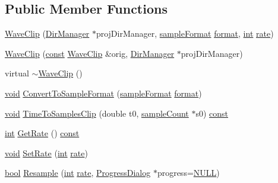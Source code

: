 \subsection*{Public Member Functions}
\begin{DoxyCompactItemize}
\item 
\hyperlink{class_wave_clip_a137e31f5028b7a419e893c05d12230df}{Wave\+Clip} (\hyperlink{class_dir_manager}{Dir\+Manager} $\ast$proj\+Dir\+Manager, \hyperlink{include_2audacity_2_types_8h_a9938d2e2f6adef23e745cd80ef379792}{sample\+Format} \hyperlink{_export_p_c_m_8cpp_a317afff57d87a89158c2b038d37b2b08}{format}, \hyperlink{xmltok_8h_a5a0d4a5641ce434f1d23533f2b2e6653}{int} \hyperlink{seqread_8c_ad89d3fac2deab7a9cf6cfc8d15341b85}{rate})
\item 
\hyperlink{class_wave_clip_a0974e16a17bd01f8b4a842a987bf12b9}{Wave\+Clip} (\hyperlink{getopt1_8c_a2c212835823e3c54a8ab6d95c652660e}{const} \hyperlink{class_wave_clip}{Wave\+Clip} \&orig, \hyperlink{class_dir_manager}{Dir\+Manager} $\ast$proj\+Dir\+Manager)
\item 
virtual \hyperlink{class_wave_clip_a787f4991485865ac2eae852e14bb510d}{$\sim$\+Wave\+Clip} ()
\item 
\hyperlink{sound_8c_ae35f5844602719cf66324f4de2a658b3}{void} \hyperlink{class_wave_clip_ad1f78194df6c1f261b9d375359779c3d}{Convert\+To\+Sample\+Format} (\hyperlink{include_2audacity_2_types_8h_a9938d2e2f6adef23e745cd80ef379792}{sample\+Format} \hyperlink{_export_p_c_m_8cpp_a317afff57d87a89158c2b038d37b2b08}{format})
\item 
\hyperlink{sound_8c_ae35f5844602719cf66324f4de2a658b3}{void} \hyperlink{class_wave_clip_a391ab35fa8e9cc0549060cf46e4b5ba4}{Time\+To\+Samples\+Clip} (double t0, \hyperlink{include_2audacity_2_types_8h_afa427e1f521ea5ec12d054e8bd4d0f71}{sample\+Count} $\ast$s0) \hyperlink{getopt1_8c_a2c212835823e3c54a8ab6d95c652660e}{const} 
\item 
\hyperlink{xmltok_8h_a5a0d4a5641ce434f1d23533f2b2e6653}{int} \hyperlink{class_wave_clip_a04d1806de89e39538576880a8dd43c11}{Get\+Rate} () \hyperlink{getopt1_8c_a2c212835823e3c54a8ab6d95c652660e}{const} 
\item 
\hyperlink{sound_8c_ae35f5844602719cf66324f4de2a658b3}{void} \hyperlink{class_wave_clip_a699a045d7e0665a010745bcf0f513f45}{Set\+Rate} (\hyperlink{xmltok_8h_a5a0d4a5641ce434f1d23533f2b2e6653}{int} \hyperlink{seqread_8c_ad89d3fac2deab7a9cf6cfc8d15341b85}{rate})
\item 
\hyperlink{mac_2config_2i386_2lib-src_2libsoxr_2soxr-config_8h_abb452686968e48b67397da5f97445f5b}{bool} \hyperlink{class_wave_clip_ada848d3405e07d83918b614a42a1799b}{Resample} (\hyperlink{xmltok_8h_a5a0d4a5641ce434f1d23533f2b2e6653}{int} \hyperlink{seqread_8c_ad89d3fac2deab7a9cf6cfc8d15341b85}{rate}, \hyperlink{class_progress_dialog}{Progress\+Dialog} $\ast$progress=\hyperlink{px__mixer_8h_a070d2ce7b6bb7e5c05602aa8c308d0c4}{N\+U\+LL})

\end{DoxyCompactItemize}
